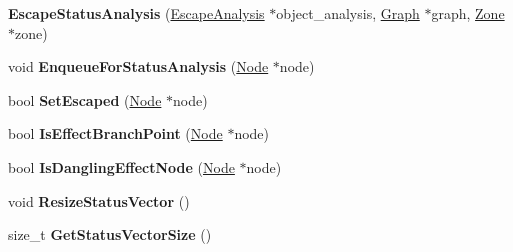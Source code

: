 \begin{DoxyCompactItemize}
\item 
{\bfseries Escape\+Status\+Analysis} (\hyperlink{classv8_1_1internal_1_1compiler_1_1_escape_analysis}{Escape\+Analysis} $\ast$object\+\_\+analysis, \hyperlink{classv8_1_1internal_1_1compiler_1_1_graph}{Graph} $\ast$graph, \hyperlink{classv8_1_1internal_1_1_zone}{Zone} $\ast$zone)\hypertarget{classv8_1_1internal_1_1compiler_1_1_escape_status_analysis_a16f7b5c8fdafb10ec2437a9a434f90bb}{}\label{classv8_1_1internal_1_1compiler_1_1_escape_status_analysis_a16f7b5c8fdafb10ec2437a9a434f90bb}

\item 
void {\bfseries Enqueue\+For\+Status\+Analysis} (\hyperlink{classv8_1_1internal_1_1compiler_1_1_node}{Node} $\ast$node)\hypertarget{classv8_1_1internal_1_1compiler_1_1_escape_status_analysis_a956e488f6fa47855ee8da9f62383b180}{}\label{classv8_1_1internal_1_1compiler_1_1_escape_status_analysis_a956e488f6fa47855ee8da9f62383b180}

\item 
bool {\bfseries Set\+Escaped} (\hyperlink{classv8_1_1internal_1_1compiler_1_1_node}{Node} $\ast$node)\hypertarget{classv8_1_1internal_1_1compiler_1_1_escape_status_analysis_a397ce5cdbd521bf31811333c96e5e02a}{}\label{classv8_1_1internal_1_1compiler_1_1_escape_status_analysis_a397ce5cdbd521bf31811333c96e5e02a}

\item 
bool {\bfseries Is\+Effect\+Branch\+Point} (\hyperlink{classv8_1_1internal_1_1compiler_1_1_node}{Node} $\ast$node)\hypertarget{classv8_1_1internal_1_1compiler_1_1_escape_status_analysis_a20366aa8016720e9bf7a009861ddef19}{}\label{classv8_1_1internal_1_1compiler_1_1_escape_status_analysis_a20366aa8016720e9bf7a009861ddef19}

\item 
bool {\bfseries Is\+Dangling\+Effect\+Node} (\hyperlink{classv8_1_1internal_1_1compiler_1_1_node}{Node} $\ast$node)\hypertarget{classv8_1_1internal_1_1compiler_1_1_escape_status_analysis_a2f992a12c1ef6cc6f326672d462989b0}{}\label{classv8_1_1internal_1_1compiler_1_1_escape_status_analysis_a2f992a12c1ef6cc6f326672d462989b0}

\item 
void {\bfseries Resize\+Status\+Vector} ()\hypertarget{classv8_1_1internal_1_1compiler_1_1_escape_status_analysis_a27925ca3f1c469a8c6d1d86c45af5149}{}\label{classv8_1_1internal_1_1compiler_1_1_escape_status_analysis_a27925ca3f1c469a8c6d1d86c45af5149}

\item 
size\+\_\+t {\bfseries Get\+Status\+Vector\+Size} ()\hypertarget{classv8_1_1internal_1_1compiler_1_1_escape_status_analysis_a07db00d3b009fe0a9bd8c802e8fbe93e}{}\label{classv8_1_1internal_1_1compiler_1_1_escape_status_analysis_a07db00d3b009fe0a9bd8c802e8fbe93e}


\end{DoxyCompactItemize}
